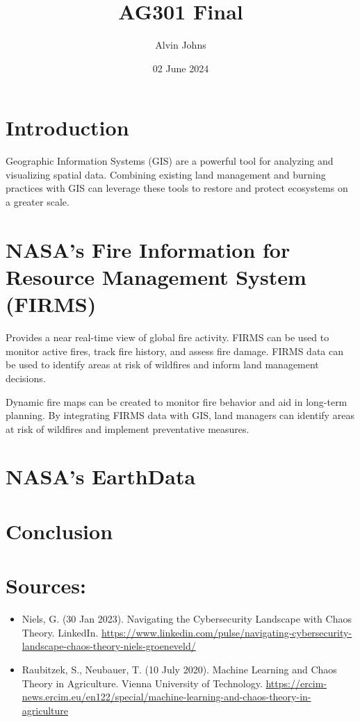 \documentclass{article}
\title{AG301 Final}
\author{Alvin Johns}
\date{02 June 2024}
\begin{document}
\maketitle

\raggedright

\section*{Introduction}

Geographic Information Systems (GIS) are a powerful tool for analyzing and visualizing spatial data. Combining existing land management and burning practices with GIS can leverage these tools to restore and protect ecosystems on a greater scale.

\section*{NASA's Fire Information for Resource Management System (FIRMS)}
Provides a near real-time view of global fire activity. FIRMS can be used to monitor active fires, track fire history, and assess fire damage. FIRMS data can be used to identify areas at risk of wildfires and inform land management decisions.

Dynamic fire maps can be created to monitor fire behavior and aid in long-term planning. By integrating FIRMS data with GIS, land managers can identify areas at risk of wildfires and implement preventative measures.

\section*{NASA's EarthData}

\section*{}


\section*{}


\section*{Conclusion}

\newpage

\section*{Sources:}

\small
\begin{itemize}
    \sloppy
    \item Niels, G. (30 Jan 2023). Navigating the Cybersecurity Landscape with Chaos Theory. LinkedIn.
    \url{https://www.linkedin.com/pulse/navigating-cybersecurity-landscape-chaos-theory-niels-groeneveld/}
    \item Raubitzek, S., Neubauer, T. (10 July 2020). Machine Learning and Chaos Theory in Agriculture. Vienna University of Technology.
    \url{https://ercim-news.ercim.eu/en122/special/machine-learning-and-chaos-theory-in-agriculture} 
\end{itemize}
\end{document}
